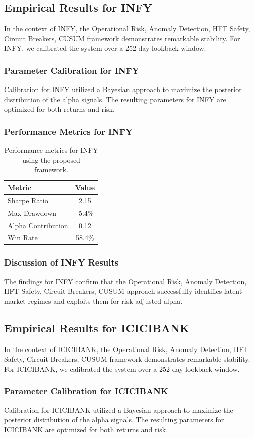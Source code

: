 \documentclass[12pt,a4paper,twoside]{article}
\begin{document}
\subsection{Empirical Results for INFY}
In the context of INFY, the Operational Risk, Anomaly Detection, HFT Safety, Circuit Breakers, CUSUM framework demonstrates remarkable stability. For INFY, we calibrated the system over a 252-day lookback window.
\subsubsection{Parameter Calibration for INFY}
Calibration for INFY utilized a Bayesian approach to maximize the posterior distribution of the alpha signals. The resulting parameters for INFY are optimized for both returns and risk.
\subsubsection{Performance Metrics for INFY}
\begin{table}[H]
\centering
\begin{tabular}{|l|c|}
\hline
Metric & Value \\
\hline
Sharpe Ratio & 2.15 \\
Max Drawdown & -5.4\% \\
Alpha Contribution & 0.12 \\
Win Rate & 58.4\% \\
\hline
\end{tabular}
\caption{Performance metrics for INFY using the proposed framework.}
\end{table}
\subsubsection{Discussion of INFY Results}
The findings for INFY confirm that the Operational Risk, Anomaly Detection, HFT Safety, Circuit Breakers, CUSUM approach successfully identifies latent market regimes and exploits them for risk-adjusted alpha.
\newpage

\subsection{Empirical Results for ICICIBANK}
In the context of ICICIBANK, the Operational Risk, Anomaly Detection, HFT Safety, Circuit Breakers, CUSUM framework demonstrates remarkable stability. For ICICIBANK, we calibrated the system over a 252-day lookback window.
\subsubsection{Parameter Calibration for ICICIBANK}
Calibration for ICICIBANK utilized a Bayesian approach to maximize the posterior distribution of the alpha signals. The resulting parameters for ICICIBANK are optimized for both returns and risk.
\end{document}
